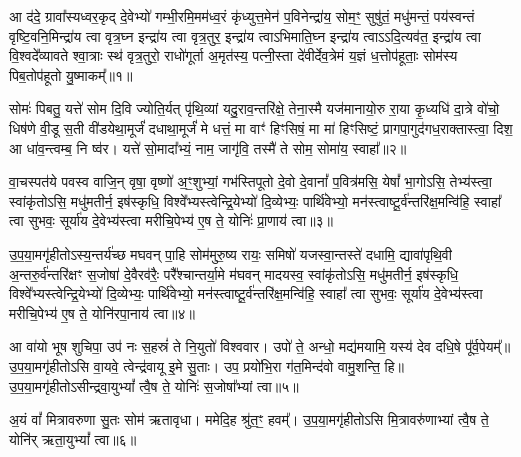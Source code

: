\setcounter{anuvakam}{0}
आ द॑दे॒ ग्रावा᳚स्यध्वर॒कृद् दे॒वेभ्यो॑ गम्भी॒रमि॒मम॑ध्व॒रं कृ॑ध्युत्त॒मेन॑ प॒विनेन्द्रा॑य॒ सोम॒ꣳ॒ सुषु॑तं॒ मधु॑मन्तं॒ पय॑स्वन्तं वृष्टि॒वनि॒मिन्द्रा॑य त्वा वृत्र॒घ्न इन्द्रा॑य त्वा वृत्र॒तुर॒ इन्द्रा॑य त्वा\-ऽभिमाति॒घ्न इन्द्रा॑य त्वा\-ऽ\-ऽदि॒त्यव॑त॒ इन्द्रा॑य त्वा वि॒श्वदे᳚व्यावते श्वा॒त्राः स्थ॑ वृत्र॒तुरो॒ राधो॑गूर्ता अ॒मृत॑स्य॒ पत्नी॒स्ता दे॑वीर्देव॒त्रेमं य॒ज्ञं ध॒त्तोप॑हूताः॒ सोम॑स्य पिब॒तोप॑हूतो यु॒ष्माकम्᳚॥१॥

सोमः॑ पिबतु॒ यत्ते॑ सोम दि॒वि ज्योति॒र्यत् पृ॑थि॒व्यां यदु॒राव॒न्तरि॑क्षे॒ तेना॒स्मै यज॑मानायो॒रु रा॒या कृ॒ध्यधि॑ दा॒त्रे वो॑चो॒ धिष॑णे वी॒डू स॒ती वी॑डयेथा॒मूर्जं॑ दधाथा॒मूर्जं॑ मे धत्तं॒ मा वाꣳ॑ हिꣳसिषं॒ मा मा॑ हिꣳसिष्टं॒ प्रागपा॒गुद॑गध॒राक्तास्त्वा॒ दिश॒ आ धा॑व॒न्त्वम्ब॒ नि ष्व॑र। यत्ते॑ सो॒मादा᳚भ्यं॒ नाम॒ जागृ॑वि॒ तस्मै॑ ते सोम॒ सोमा॑य॒ स्वाहा᳚॥२॥

{\anuvakamend[{यु॒ष्माकꣴ॑ स्वर॒ यत्ते॒ नव॑ च॥१॥}]}

वा॒चस्पत॑ये पवस्व वाजि॒न् वृषा॒ वृष्णो॑ अ॒ꣳ॒शुभ्यां॒ गभ॑स्तिपूतो दे॒वो दे॒वानां᳚ प॒वित्र॑मसि॒ येषां᳚ भा॒गो\-ऽसि॒ तेभ्य॑स्त्वा॒ स्वांकृ॑तो\-ऽसि॒ मधु॑मतीर्न॒ इष॑स्कृधि॒ विश्वे᳚भ्यस्त्वेन्द्रि॒येभ्यो॑ दि॒व्येभ्यः॒ पार्थि॑वेभ्यो॒ मन॑स्त्वाष्टू॒र्व॑न्तरि॑क्ष॒मन्वि॑हि॒ स्वाहा᳚ त्वा सुभवः॒ सूर्या॑य दे॒वेभ्य॑स्त्वा मरीचि॒पेभ्य॑ ए॒ष ते॒ योनिः॑ प्रा॒णाय॑ त्वा॥३॥

{\anuvakamend[{वा॒चः स॒प्तच॑त्वारिꣳशत्॥२॥}]}

उ॒प॒या॒मगृ॑हीतो\-ऽस्य॒न्तर्य॑च्छ मघवन् पा॒हि सोम॑मुरु॒ष्य रायः॒ समिषो॑ यजस्वा॒न्तस्ते॑ दधामि॒ द्यावा॑पृथि॒वी अ॒न्तरु॒र्व॑न्तरि॑क्षꣳ स॒जोषा॑ दे॒वैरव॑रैः॒ परै᳚श्चान्तर्या॒मे म॑घवन् मादयस्व॒ स्वांकृ॑तो\-ऽसि॒ मधु॑मतीर्न॒ इष॑स्कृधि॒ विश्वे᳚भ्यस्त्वेन्द्रि॒येभ्यो॑ दि॒व्येभ्यः॒ पार्थि॑वेभ्यो॒ मन॑स्त्वाष्टू॒र्व॑न्तरि॑क्ष॒मन्वि॑हि॒ स्वाहा᳚ त्वा सुभवः॒ सूर्या॑य दे॒वेभ्य॑स्त्वा मरीचि॒पेभ्य॑ ए॒ष ते॒ योनि॑रपा॒नाय॑ त्वा॥४॥

{\anuvakamend[{दे॒वेभ्यः॑ स॒प्त च॑॥३॥}]}

आ वा॑यो भूष शुचिपा॒ उप॑ नः स॒हस्रं॑ ते नि॒युतो॑ विश्ववार। उपो॑ ते॒ अन्धो॒ मद्य॑मयामि॒ यस्य॑ देव दधि॒षे पू᳚र्व॒पेयम्᳚॥ उ॒प॒या॒मगृ॑हीतो\-ऽसि वा॒यवे॒ त्वेन्द्र॑वायू इ॒मे सु॒ताः। उप॒ प्रयो॑भि॒रा ग॑त॒मिन्द॑वो वामु॒शन्ति॒ हि॥ उ॒प॒या॒मगृ॑हीतो\-ऽसीन्द्रवा॒यु\-भ्यां᳚ त्वै॒ष ते॒ योनिः॑ स॒जोषा᳚भ्यां त्वा॥५॥

{\anuvakamend[{आ वा॑यो॒ त्रिच॑त्वारिꣳशत्॥४॥}]}

अ॒यं वां᳚ मित्रावरुणा सु॒तः सोम॑ ऋतावृधा। ममेदि॒ह श्रु॑त॒ꣳ॒ हवम्᳚। उ॒प॒या॒मगृ॑हीतो\-ऽसि मि॒त्रावरु॑णाभ्यां त्वै॒ष ते॒ योनि॑र् ऋता॒यु\-भ्यां᳚ त्वा॥६॥

